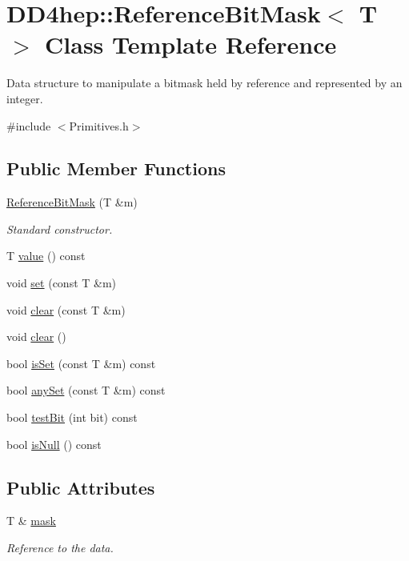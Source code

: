 \hypertarget{class_d_d4hep_1_1_reference_bit_mask}{
\section{DD4hep::ReferenceBitMask$<$ T $>$ Class Template Reference}
\label{class_d_d4hep_1_1_reference_bit_mask}
}


Data structure to manipulate a bitmask held by reference and represented by an integer.  


{\ttfamily \#include $<$Primitives.h$>$}\subsection*{Public Member Functions}
\begin{DoxyCompactItemize}
\item 
\hyperlink{class_d_d4hep_1_1_reference_bit_mask_abd3539ce53a7879da72da52fadb2b829}{ReferenceBitMask} (T \&m)
\begin{DoxyCompactList}\small\item\em Standard constructor. \item\end{DoxyCompactList}\item 
T \hyperlink{class_d_d4hep_1_1_reference_bit_mask_a3b71064829b722af036cdf74ca0d1c75}{value} () const 
\item 
void \hyperlink{class_d_d4hep_1_1_reference_bit_mask_a9b0db38e1812101d6d93e1d00944b745}{set} (const T \&m)
\item 
void \hyperlink{class_d_d4hep_1_1_reference_bit_mask_a3c384d81d710f444161e1f8cbf9420ae}{clear} (const T \&m)
\item 
void \hyperlink{class_d_d4hep_1_1_reference_bit_mask_a22b33d5d302fa4e84c10689f07886517}{clear} ()
\item 
bool \hyperlink{class_d_d4hep_1_1_reference_bit_mask_a18afb2f2dcd2b719f7251546dbbb51b1}{isSet} (const T \&m) const 
\item 
bool \hyperlink{class_d_d4hep_1_1_reference_bit_mask_a34cd8c04a587c137d339a6eb4469cd0b}{anySet} (const T \&m) const 
\item 
bool \hyperlink{class_d_d4hep_1_1_reference_bit_mask_a94a8b3a45dc44201a83558f6ac1be0e7}{testBit} (int bit) const 
\item 
bool \hyperlink{class_d_d4hep_1_1_reference_bit_mask_a9e7daae6ed22c928db375380fe7f9f93}{isNull} () const 
\end{DoxyCompactItemize}
\subsection*{Public Attributes}
\begin{DoxyCompactItemize}
\item 
T \& \hyperlink{class_d_d4hep_1_1_reference_bit_mask_aa770625de709649071feac5dc7ac1fc1}{mask}
\begin{DoxyCompactList}\small\item\em Reference to the data. \item\end{DoxyCompactList}\end{DoxyCompactItemize}


